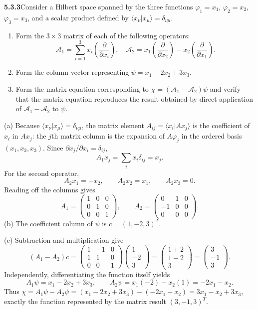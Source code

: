 \par\bigskip
\noindent\textbf{5.3.3}\quad Consider a Hilbert space spanned by the three
functions $\varphi_{1}=x_{1}$, $\varphi_{2}=x_{2}$, $\varphi_{3}=x_{3}$, and a
scalar product defined by $\langle x_{\nu}|x_{\mu}\rangle=\delta_{\nu\mu}$.
\begin{enumerate}
\item[(a)] Form the $3\times3$ matrix of each of the following operators:
  \[
  \mathcal{A}_{1}=\sum_{i=1}^{3}x_{i}\left(\frac{\partial}{\partial x_{i}}
  \right),\quad
  \mathcal{A}_{2}=x_{1}\left(\frac{\partial}{\partial x_{2}}\right)
  -x_{2}\left(\frac{\partial}{\partial x_{1}}\right).
  \]
\item[(b)] Form the column vector representing $\psi=x_{1}-2x_{2}+3x_{3}$.
\item[(c)] Form the matrix equation corresponding to
  $\chi=(\mathcal{A}_{1}-\mathcal{A}_{2})\psi$ and verify that the matrix
  equation reproduces the result obtained by direct application of
  $\mathcal{A}_{1}-\mathcal{A}_{2}$ to $\psi$.
\end{enumerate}
\solution
(a) Because $\langle x_\nu|x_\mu\rangle=\delta_{\nu\mu}$, the matrix
element $A_{ij}=\langle x_i|Ax_j\rangle$ is the coefficient of $x_i$ in
$Ax_j$: the $j$th matrix column is the expansion of $A\varphi_j$ in the
ordered basis $(x_1,x_2,x_3)$. Since
$\partial x_j/\partial x_i=\delta_{ij}$,
\[
A_1x_j=\sum_i x_i\delta_{ij}=x_j.
\]
For the second operator,
\[
A_2x_1=-x_2,\qquad A_2x_2=x_1,\qquad A_2x_3=0.
\]
Reading off the columns gives
\[
\boxed{A_1=\begin{pmatrix}1&0&0\\0&1&0\\0&0&1\end{pmatrix},\qquad
A_2=\begin{pmatrix}0&1&0\\-1&0&0\\0&0&0\end{pmatrix}}.
\]
(b) The coefficient column of $\psi$ is $c=(1,-2,3)^T$.

(c) Subtraction and multiplication give
\[
(A_1-A_2)c
=\begin{pmatrix}1&-1&0\\1&1&0\\0&0&1\end{pmatrix}
 \begin{pmatrix}1\\-2\\3\end{pmatrix}
=\begin{pmatrix}1+2\\1-2\\3\end{pmatrix}
=\begin{pmatrix}3\\-1\\3\end{pmatrix}.
\]
Independently, differentiating the function itself yields
\[
A_1\psi=x_1-2x_2+3x_3,\qquad
A_2\psi=x_1(-2)-x_2(1)=-2x_1-x_2.
\]
Thus
$\chi=A_1\psi-A_2\psi=(x_1-2x_2+3x_3)-(-2x_1-x_2)=3x_1-x_2+3x_3$,
exactly the function represented by the matrix result $(3,-1,3)^T$.

